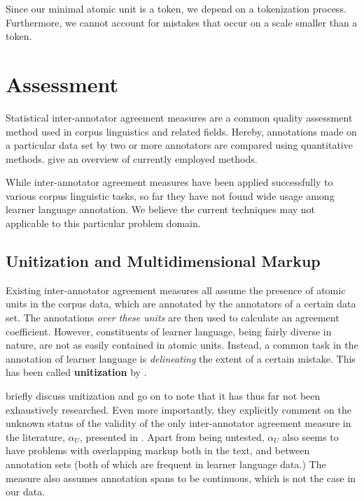 \documentclass{article}
\begin{document}
Since our minimal atomic unit is a token, we depend on a tokenization process.
Furthermore, we cannot account for mistakes that occur on a scale smaller than a
token.

\section{Assessment}\label{sec:results}

Statistical inter-annotator agreement  measures are a common quality assessment
method used in corpus linguistics and related fields. Hereby, annotations made
on a particular data set by two or more annotators are compared using
quantitative methods.  \cite{artstein} give an overview of currently employed
methods.

While inter-annotator agreement measures have been applied successfully to
various corpus linguistic tasks, so far they have not found wide usage among
learner language annotation. We believe the current techniques  may not
applicable to this particular problem domain.

\subsection{Unitization and Multidimensional Markup}

Existing inter-annotator agreement measures all assume the presence of atomic
units in the corpus data, which are annotated by the annotators of a certain
data set.  The annotations \textit{over these units} are then used to calculate an
agreement coefficient. However, constituents of learner language, being fairly
diverse in nature, are not as easily contained in atomic units. Instead, a
common task in the annotation of learner language is \textit{delineating}
the extent of a certain mistake. This has been called \textbf{unitization} by
\cite{krip}.

\cite{artstein} briefly discuss unitization and go on to note that it has thus far
not been exhaustively researched. Even more importantly, they explicitly comment
on the unknown status of the validity of the only inter-annotator agreement
measure in the literature, $\alpha_U$, presented in
\cite{krip}.  Apart from being untested, $\alpha_U$ also seems to have
problems with overlapping markup both in the text, and between annotation sets
(both of which are frequent in learner language data.) The measure also assumes
annotation spans to be continuous, which is not the case in our data.
\end{document}
